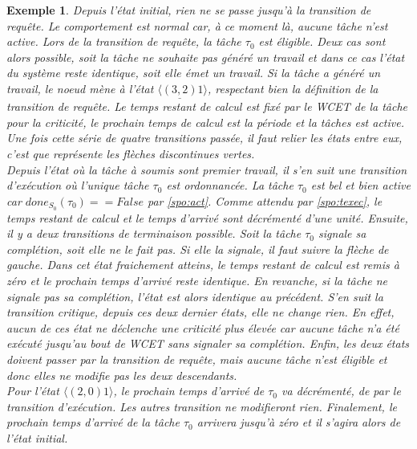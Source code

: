 \documentclass[12pt,a4paper,oneside]{book}
\theoremstyle{break}
\newtheorem{exem}{Exemple}[chapter]
\theoremstyle{breakplain}
\begin{document}
\begin{exem}
Depuis l'état initial, rien ne se passe jusqu'à la transition de requête. Le comportement est normal car, à ce moment là, aucune tâche n'est active. Lors de la transition de requête, la tâche $\tau_0$ est éligible. Deux cas sont alors possible, soit la tâche ne souhaite pas généré un travail et dans ce cas l'état du système reste identique, soit elle émet un travail. Si la tâche a généré un travail, le noeud mène à l'état $\langle \underline{(3, 2)} 1\rangle$, respectant bien la définition de la transition de requête. Le temps restant de calcul est fixé par le WCET de la tâche pour la criticité, le prochain temps de calcul est la période et la tâches est active.\\
Une fois cette série de quatre transitions passée, il faut relier les états entre eux, c'est que représente les flèches discontinues vertes.\\

Depuis l'état où la tâche à soumis sont premier travail, il s'en suit une transition d'exécution où l'unique tâche $\tau_0$ est ordonnancée. La tâche $\tau_0$ est bel et bien active car $done_{S_0}(\tau_0) == False$ par \autoref{spo:act}. Comme attendu par \autoref{spo:texec}, le temps restant de calcul et le temps d'arrivé sont décrémenté d'une unité. Ensuite, il y a deux transitions de terminaison possible. Soit la tâche $\tau_0$ signale sa complétion, soit elle ne le fait pas. Si elle la signale, il faut suivre la flèche de gauche. Dans cet état fraichement atteins, le temps restant de calcul est remis à zéro et le prochain temps d'arrivé reste identique. En revanche, si la tâche ne signale pas sa complétion, l'état est alors identique au précédent. S'en suit la transition critique, depuis ces deux dernier états, elle ne change rien. En effet, aucun de ces état ne déclenche une criticité plus élevée car aucune tâche n'a été exécuté jusqu'au bout de WCET sans signaler sa complétion. Enfin, les deux états doivent passer par la transition de requête, mais aucune tâche n'est éligible et donc elles ne modifie pas les deux descendants.\\

Pour l'état $\langle (2, 0) 1 \rangle$, le prochain temps d'arrivé de $\tau_0$ va décrémenté, de par le transition d'exécution. Les autres transition ne modifieront rien. Finalement, le prochain temps d'arrivé de la tâche $\tau_0$ arrivera jusqu'à zéro et il s'agira alors de l'état initial.\\


\end{exem}
\end{document}

